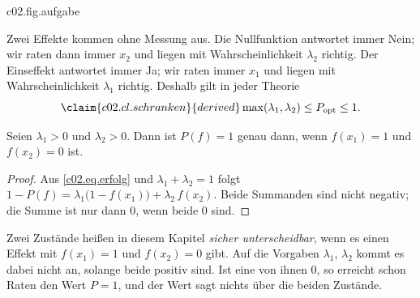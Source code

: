 \begin{tpcfigure}{c02.fig.aufgabe}
  \caption{Die Aufgabe. Links: Präpariert wird $x_1$ oder $x_2$, dann wird die Frage $f$ gestellt und nach der Antwort geraten. Rechts: die Wahrscheinlichkeiten der vier möglichen Fälle, in der oberen Zeile für die Antwort Ja, in der unteren für Nein. In den beiden stark umrandeten Fällen ist der Tipp richtig; ihre Summe ist $P(f)$ aus Gleichung~\eqref{c02.eq.erfolg}.}
\end{tpcfigure}

Zwei Effekte kommen ohne Messung aus. Die Nullfunktion antwortet immer Nein; wir raten dann
immer $x_2$ und liegen mit Wahrscheinlichkeit $\lambda_2$ richtig. Der Einseffekt antwortet
immer Ja; wir raten immer $x_1$ und liegen mit Wahrscheinlichkeit $\lambda_1$ richtig.
Deshalb gilt in jeder Theorie
\begin{equation}\label{c02.eq.schranken}\claim{c02.cl.schranken}{derived}
  \max(\lambda_1, \lambda_2) \leq P_{\mathrm{opt}} \leq 1 .
\end{equation}

\begin{proposition}\label{c02.prop.perfekt}
  Seien $\lambda_1 > 0$ und $\lambda_2 > 0$. Dann ist $P(f) = 1$ genau dann, wenn
  $f(x_1) = 1$ und $f(x_2) = 0$ ist.
\end{proposition}
\begin{proof}
  Aus \eqref{c02.eq.erfolg} und $\lambda_1 + \lambda_2 = 1$ folgt
  $1 - P(f) = \lambda_1\bigl(1 - f(x_1)\bigr) + \lambda_2\, f(x_2)$. Beide Summanden sind
  nicht negativ; die Summe ist nur dann $0$, wenn beide $0$ sind.
\end{proof}

Zwei Zustände heißen in diesem Kapitel \emph{sicher unterscheidbar}, wenn es einen Effekt
mit $f(x_1) = 1$ und $f(x_2) = 0$ gibt. Auf die Vorgaben $\lambda_1$, $\lambda_2$ kommt es
dabei nicht an, solange beide positiv sind. Ist eine von ihnen $0$, so erreicht schon
Raten den Wert $P = 1$, und der Wert sagt nichts über die beiden Zustände.

